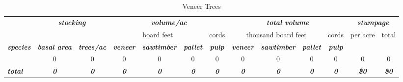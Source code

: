 \documentclass[landscape]{article}
\begin{document}
\begin{table}[H]

\caption{\label{tab:unnamed-chunk-25}Veneer Trees}
\fontsize{10}{12}\selectfont
\begin{tabular}[t]{lcccccccccccc}
\toprule
\multicolumn{1}{c}{\em{\textbf{ }}} & \multicolumn{2}{c}{\em{\textbf{stocking}}} & \multicolumn{4}{c}{\em{\textbf{volume/ac }}} & \multicolumn{4}{c}{\em{\textbf{total volume}}} & \multicolumn{2}{c}{\em{\textbf{stumpage}}} \\
\cmidrule(l{3pt}r{3pt}){2-3} \cmidrule(l{3pt}r{3pt}){4-7} \cmidrule(l{3pt}r{3pt}){8-11} \cmidrule(l{3pt}r{3pt}){12-13}
\multicolumn{3}{c}{ } & \multicolumn{3}{c}{board feet} & \multicolumn{1}{c}{cords} & \multicolumn{3}{c}{thousand board feet} & \multicolumn{1}{c}{cords} & \multicolumn{1}{c}{per acre} & \multicolumn{1}{c}{total} \\
\cmidrule(l{3pt}r{3pt}){4-6} \cmidrule(l{3pt}r{3pt}){7-7} \cmidrule(l{3pt}r{3pt}){8-10} \cmidrule(l{3pt}r{3pt}){11-11} \cmidrule(l{3pt}r{3pt}){12-12} \cmidrule(l{3pt}r{3pt}){13-13}
\rowcolor[HTML]{DCDCDC}  \em{\textbf{species}} & \em{\textbf{basal area}} & \em{\textbf{trees/ac}} & \em{\textbf{veneer}} & \em{\textbf{sawtimber}} & \em{\textbf{pallet}} & \em{\textbf{pulp}} & \em{\textbf{veneer}} & \em{\textbf{sawtimber}} & \em{\textbf{pallet}} & \em{\textbf{pulp}} & \em{\textbf{ }} & \em{\textbf{ }}\\
\midrule
\rowcolor{gray!6}   & 0 & 0 & 0 & 0 & 0 & 0 & 0 & 0 & 0 & 0 & 0 & 0\\
 
\rowcolor[HTML]{DCDCDC}  \em{\textbf{total}} & \em{\textbf{0}} & \em{\textbf{0}} & \em{\textbf{0}} & \em{\textbf{0}} & \em{\textbf{0}} & \em{\textbf{0}} & \em{\textbf{0}} & \em{\textbf{0}} & \em{\textbf{0}} & \em{\textbf{0}} & \em{\textbf{\$0}} & \em{\textbf{\$0}}\\
\bottomrule
\end{tabular}
\end{table}
\end{document}
